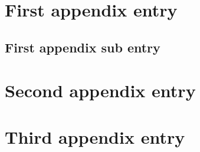 \section{First appendix entry}

\subsection{First appendix sub entry}

\section{Second appendix entry}

\section{Third appendix entry}
